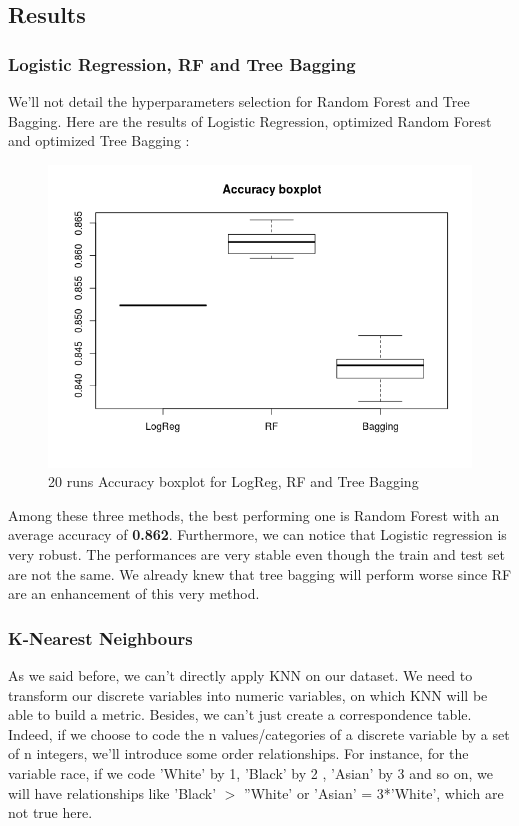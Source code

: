 \documentclass[11pt]{article}
\begin{document}
\subsection{Results}
\subsubsection{Logistic Regression, RF and Tree Bagging}
We'll not detail the hyperparameters selection for Random Forest and Tree Bagging. Here are the results of Logistic Regression, optimized Random Forest and optimized Tree Bagging : 

\begin{figure}[!h]
\begin{center}
\includegraphics[scale=0.8]{images/accuracy_boxplot.png}

\end{center}
\caption{20 runs Accuracy boxplot for LogReg, RF and Tree Bagging}
\end{figure}

Among these three methods, the best performing one is Random Forest with an average accuracy of \textbf{0.862}. Furthermore, we can notice that Logistic regression is very robust. The performances are very stable even though the train and test set are not the same. We already knew that tree bagging will perform worse since RF are an enhancement of this very method.

\subsubsection{K-Nearest Neighbours}

As we said before, we can't directly apply KNN on our dataset. We need to transform our discrete variables into numeric variables, on which KNN will be able to build a metric. Besides, we can't just create a correspondence table. Indeed, if we choose to code the n values/categories of a discrete variable by a set of n integers, we'll introduce some order relationships. For instance, for the variable race, if we code 'White' by 1, 'Black' by 2 , 'Asian' by 3 and so on, we will have relationships like 'Black' $>$ ''White' or 'Asian' = 3*'White', which are not true here.  
\end{document}
